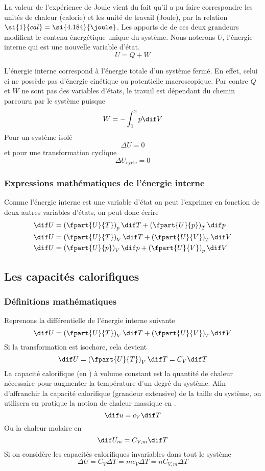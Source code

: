 La valeur de l'expérience de Joule vient du fait qu'il a pu
faire correspondre les unités de chaleur (calorie) et
les unité de travail (Joule), par la relation
$\si{1}{cal} = \si{4.184}{\joule}$.
Les apports de de ces deux grandeurs modifient
le contenu énergétique unique du système.
Nous noterons $U$, l'énergie interne qui est une nouvelle variable d'état.
\[ U = Q + W \]

L'énergie interne correspond à l'énergie totale d'un système fermé.
En effet, celui ci ne possède pas d'énergie cinétique ou
potentielle macroscopique.
Par contre $Q$ et $W$ ne sont pas des variables d'états,
le travail est dépendant du chemin parcouru par le système puisque
\[W = - \int_1^2p\dif V \]
Pour un système isolé
\[ \Delta U = 0 \]
et pour une transformation cyclique
\[ \Delta U_\mathrm{cycle} = 0 \]

\subsubsection{Expressions mathématiques de l'énergie interne}
Comme l'énergie interne est une variable d'état on peut l'exprimer en
fonction de deux autres variables d'états, on peut donc écrire
\begin{align*}
  \dif U & =
  \left(\fpart{U}{T}\right)_p \dif T +
  \left(\fpart{U}{p}\right)_T \dif p\\
  \dif U & =
  \left(\fpart{U}{T}\right)_V \dif T +
  \left(\fpart{U}{V}\right)_T \dif V\\
  \dif U & =
  \left(\fpart{U}{p}\right)_V \dif p +
  \left(\fpart{U}{V}\right)_p \dif V
\end{align*}

\subsection{Les capacités calorifiques}
\subsubsection{Définitions mathématiques}
Reprenons la différentielle de l'énergie interne suivante
\[ \dif U = \left(\fpart{U}{T}\right)_V \dif T +
\left(\fpart{U}{V}\right)_T \dif V \]
Si la transformation est isochore, cela devient
\[ \dif U = \left(\fpart{U}{T}\right)_V \dif T = C_V \dif T \]
La capacité calorifique (en \joule\per\kelvin) à volume constant est
la quantité de chaleur nécessaire pour
augmenter la température d'un degré du système.
Afin d'affranchir la capacité calorifique (grandeur extensive)
de la taille du système, on utilisera en pratique
la notion de chaleur massique en \joule\per\kilogram\cdot\kelvin.
\[ \dif u = c_V\dif T \]
Ou la chaleur molaire en \joule\per\mole\cdot\kelvin
\[ \dif U_m = C_{V,m}\dif T \]
Si on considère les capacités calorifiques invariables dans tout le système
\[ \Delta U = C_V \Delta T = mc_V\Delta T = nC_{V,m}\Delta T \]

